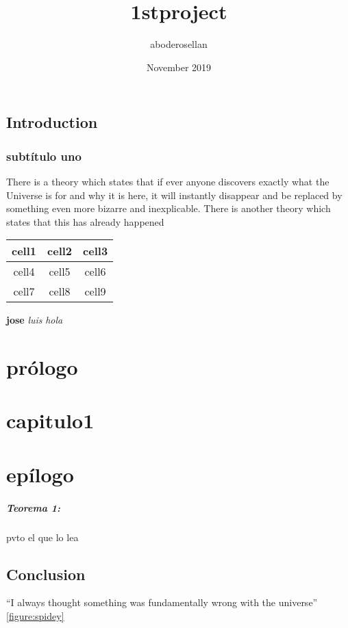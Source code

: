 \documentclass{book}
\title{1stproject}
\author{aboderosellan }
\date{November 2019}
\begin{document}
\maketitle

\section{Introduction}
\subsection{subtítulo uno}
There is a theory which states that if ever anyone discovers exactly what the Universe is for and why it is here, it will instantly disappear and be replaced by something even more bizarre and inexplicable.
There is another theory which states that this has already happened

\begin{table}[h!]
\begin{center}
\begin{tabular}{|c|c|c|}
\hline
cell1 & cell2 & cell3\\
\hline
cell4 & cell5 & cell6\\
\hline 
cell7 & cell8 & cell9\\
\hline
\end{tabular}
\end{center}
\end{table}

\textbf{jose}
\textit{luis}
\emph{hola}\\


\chapter*{prólogo}
\chapter{capitulo1}
\chapter*{epílogo} %

\paragraph{Teorema 1:}
pvto el que lo lea 


\section{Conclusion}
``I always thought something was fundamentally wrong with the universe'' \ref{figure:spidey} \citep{adams1995hitchhiker}



\end{document}
